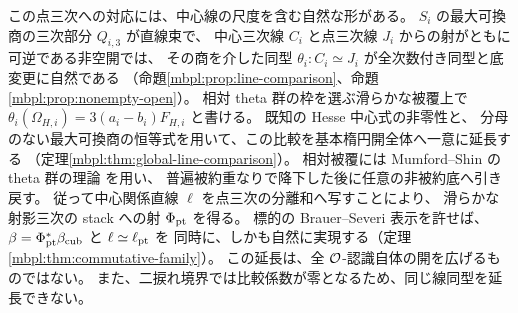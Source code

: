 この点三次への対応には、中心線の尺度を含む自然な形がある。
$S_i$ の最大可換商の三次部分 $Q_{i,3}$ が直線束で、
中心三次線 $C_i$ と点三次線 $J_i$ からの射がともに可逆である非空開では、
その商を介した同型 $\theta_i:C_i\simeq J_i$ が全次数付き同型と底変更に自然である
（命題\ref{mbpl:prop:line-comparison}、命題\ref{mbpl:prop:nonempty-open}）。
相対 theta 群の枠を選ぶ滑らかな被覆上で
$\theta_i(\Omega_{H,i})=3(a_i-b_i)F_{H,i}$ と書ける。
既知の Hesse 中心式\cite[\S2, p.~3]{GRSklyaninDLL}の非零性と、
分母のない最大可換商の恒等式を用いて、この比較を基本楕円開全体へ一意に延長する
（定理\ref{mbpl:thm:global-line-comparison}）。
相対被覆には Mumford--Shin の theta 群の理論
\cite{MBPLMumfordTheta,MBPLShinWeil}を用い、
普遍被約重なりで降下した後に任意の非被約底へ引き戻す。
従って中心関係直線 $\ell$ を点三次の分離和へ写すことにより、
滑らかな射影三次の stack への射 $\Phi_{\rm pt}$ を得る。
標的の Brauer--Severi 表示を許せば、
$\beta=\Phi_{\rm pt}^*\beta_{\rm cub}$ と $\ell\simeq\ell_{\rm pt}$ を
同時に、しかも自然に実現する（定理\ref{mbpl:thm:commutative-family}）。
この延長は、全 $\mathcal O$-認識自体の開を広げるものではない。
また、二捩れ境界では比較係数が零となるため、同じ線同型を延長できない。


